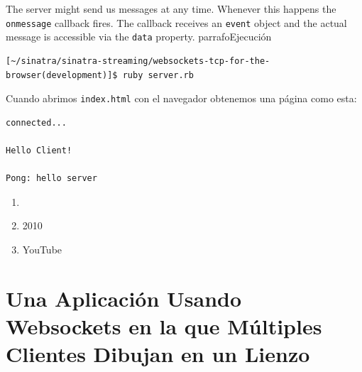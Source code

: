 The server might send us messages at any time. Whenever this happens
the \verb|onmessage| callback fires. The callback receives an \verb|event| object
and the actual message is accessible via the \verb|data| property.
parrafo{Ejecución}

\begin{verbatim}
[~/sinatra/sinatra-streaming/websockets-tcp-for-the-browser(development)]$ ruby server.rb
\end{verbatim}

Cuando abrimos \verb|index.html| con el navegador obtenemos una página como esta:
\begin{verbatim}
connected...

Hello Client!

Pong: hello server
\end{verbatim}

\begin{enumerate}
\item 
{}
\item 
{}
2010
\item 
{} YouTube
\end{enumerate}

\section{Una Aplicación Usando Websockets en la que Múltiples Clientes Dibujan en un Lienzo}


